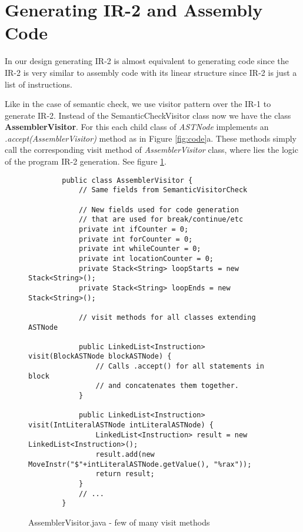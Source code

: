 \documentclass{article}[11pt]
\begin{document}
\section{Generating IR-2 and Assembly Code}
\label{sec:codegen}
In our design generating IR-2 is almost equivalent to generating code since the IR-2 is very similar to assembly code with its linear structure since IR-2 is just a list of instructions.

Like in the case of semantic check, we use visitor pattern over the IR-1 to generate IR-2. Instead of the SemanticCheckVisitor class now we have the class \textbf{AssemblerVisitor}. For this each child class of \textit{ASTNode} implements an \textit{.accept(AssemblerVisitor)} method as in Figure \ref{fig:code}a. These methods simply call the corresponding visit method of \textit{AssemblerVisitor} class, where lies the logic of the program IR-2 generation. See figure \ref{code:asm_visitor}.

\begin{figure}
    \begin{lstlisting}
        public class AssemblerVisitor {
            // Same fields from SemanticVisitorCheck
            
            // New fields used for code generation
            // that are used for break/continue/etc
            private int ifCounter = 0;
            private int forCounter = 0;
            private int whileCounter = 0;
            private int locationCounter = 0;
            private Stack<String> loopStarts = new Stack<String>();
            private Stack<String> loopEnds = new Stack<String>();
            
            // visit methods for all classes extending ASTNode
            
            public LinkedList<Instruction> visit(BlockASTNode blockASTNode) {
                // Calls .accept() for all statements in block
                // and concatenates them together.
            }
            
            public LinkedList<Instruction> visit(IntLiteralASTNode intLiteralASTNode) {
                LinkedList<Instruction> result = new LinkedList<Instruction>();
                result.add(new MoveInstr("$"+intLiteralASTNode.getValue(), "%rax"));
                return result;
            }
            // ...
        }
    \end{lstlisting}
    \caption{AssemblerVisitor.java - few of many visit methods}
    \label{code:asm_visitor}
\end{figure}
\end{document}
